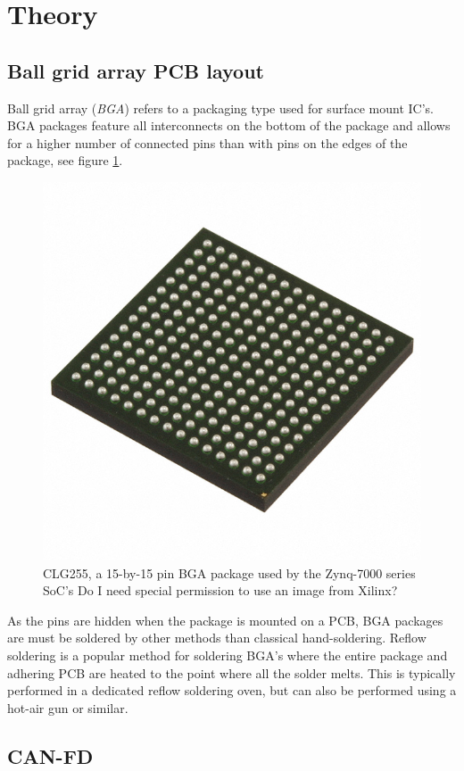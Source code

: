 \section{Theory}

\subsection{Ball grid array PCB layout}

Ball grid array (\emph{BGA}) refers to a packaging type used for surface mount IC's. BGA packages feature all interconnects on the bottom of the package and allows for a higher number of connected pins than with pins on the edges of the package, see figure \ref{fig:clg255}.

\begin{figure}[H]
    \centering
    \includegraphics[width=.75\textwidth]{media/CLG225.JPG}
    \caption{CLG255, a 15-by-15 pin BGA package used by the Zynq-7000 series SoC's \cite{clg225} {\color{red}Do I need special permission to use an image from Xilinx?}}
    \label{fig:clg255}
\end{figure}

As the pins are hidden when the package is mounted on a PCB, BGA packages are must be soldered by other methods than classical hand-soldering. Reflow soldering is a popular method for soldering BGA's where the entire package and adhering PCB are heated to the point where all the solder melts. This is typically performed in a dedicated reflow soldering oven, but can also be performed using a hot-air gun or similar.


\subsection{CAN-FD}

